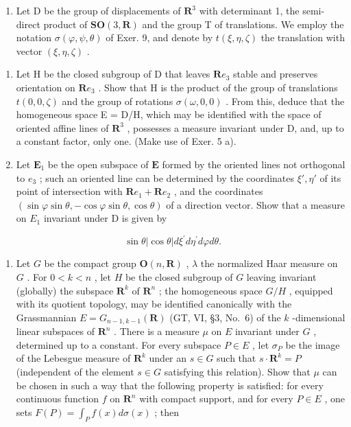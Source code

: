 \begin{enumerate}
\def\labelenumi{\arabic{enumi})}
\setcounter{enumi}{9}
\tightlist
\item
  Let D be the group of displacements of \(\mathbf{R}^{3}\) with determinant 1, the semi-direct product of \(\mathbf{SO}(3,\mathbf{R})\) and the group T of translations. We employ the notation \(\sigma(\varphi,\psi,\theta)\) of Exer. 9, and denote by \(t(\xi,\eta,\zeta)\) the translation with vector \((\xi,\eta,\zeta)\) .
\end{enumerate}

\begin{enumerate}
\def\labelenumi{\alph{enumi})}
\item
  Let H be the closed subgroup of D that leaves \(\mathbf{R}e_{3}\) stable and preserves orientation on \(\mathbf{R}e_{3}\) . Show that H is the product of the group of translations \(t(0,0,\zeta)\) and the group of rotations \(\sigma(\omega,0,0)\) . From this, deduce that the homogeneous space E = D/H, which may be identified with the space of oriented affine lines of \(\mathbf{R}^{3}\) , possesses a measure invariant under D, and, up to a constant factor, only one. (Make use of Exer. 5 a).
\item
  Let \(\mathbf{E}_1\) be the open subspace of \(\mathbf{E}\) formed by the oriented lines not orthogonal to \(e_3\) ; such an oriented line can be determined by the coordinates \(\xi', \eta'\) of its point of intersection with \(\mathbf{R}e_{1} + \mathbf{R}e_{2}\) , and the coordinates \((\sin \varphi \sin \theta, -\cos \varphi \sin \theta, \cos \theta)\) of a direction vector. Show that a measure on \(E_{1}\) invariant under D is given by
\end{enumerate}

\[
\sin \theta | \cos \theta | d \xi^ {\prime} d \eta^ {\prime} d \varphi d \theta .
\]

\begin{enumerate}
\def\labelenumi{\arabic{enumi})}
\setcounter{enumi}{10}
\tightlist
\item
  Let \(G\) be the compact group \(\mathbf{O}(n, \mathbf{R})\) , \(\lambda\) the normalized Haar measure on \(G\) . For \(0 < k < n\) , let \(H\) be the closed subgroup of \(G\) leaving invariant (globally) the subspace \(\mathbf{R}^k\) of \(\mathbf{R}^n\) ; the homogeneous space \(G / H\) , equipped with its quotient topology, may be identified canonically with the Grassmannian \(E = G_{n-1, k-1}(\mathbf{R})\) (GT, VI, §3, No.~6) of the \(k\) -dimensional linear subspaces of \(\mathbf{R}^n\) . There is a measure \(\mu\) on \(E\) invariant under \(G\) , determined up to a constant. For every subspace \(P \in E\) , let \(\sigma_P\) be the image of the Lebesgue measure of \(\mathbf{R}^k\) under an \(s \in G\) such that \(s \cdot \mathbf{R}^k = P\) (independent of the element \(s \in G\) satisfying this relation). Show that \(\mu\) can be chosen in such a way that the following property is satisfied: for every continuous function \(f\) on \(\mathbf{R}^n\) with compact support, and for every \(P \in E\) , one sets \(F(P) = \int_{P} f(x) d\sigma(x)\) ; then
\end{enumerate}

